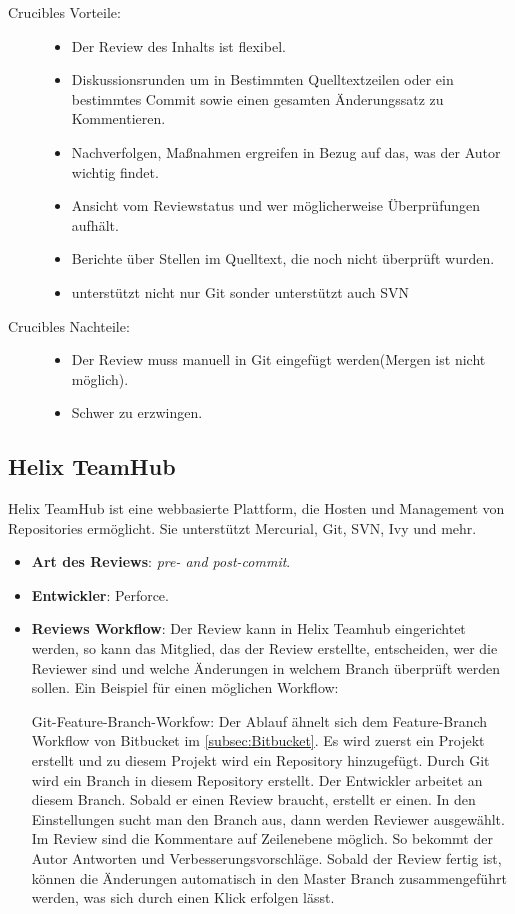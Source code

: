 \begin{description}
	\item [Crucibles Vorteile:] \hfill
	\begin{itemize}
		\item Der Review des Inhalts ist flexibel.
		\item Diskussionsrunden um in Bestimmten Quelltextzeilen oder ein bestimmtes Commit sowie einen gesamten Änderungssatz zu Kommentieren.
		\item Nachverfolgen, Maßnahmen ergreifen in Bezug auf das, was der Autor wichtig findet.
		\item Ansicht vom Reviewstatus und wer möglicherweise Überprüfungen aufhält.
		\item Berichte über Stellen im Quelltext, die noch nicht überprüft wurden.
		\item unterstützt nicht nur Git sonder unterstützt auch \ac{SVN}
	\end{itemize}
	
	\item [Crucibles Nachteile:] \hfill
	\begin{itemize}
		\item Der Review muss manuell in Git eingefügt werden(Mergen ist nicht möglich).
		\item Schwer zu erzwingen.
	\end{itemize}
\end{description}

\subsection{Helix TeamHub}
\label{subsec:HelixTeamHub}

Helix TeamHub ist eine webbasierte Plattform, die Hosten und Management von Repositories ermöglicht. Sie unterstützt Mercurial, Git, \ac{SVN}, Ivy und mehr.

\begin{itemize}
	\item \textbf{Art des Reviews}: \textit{pre- and post-commit}.
	\item \textbf{Entwickler}: Perforce. 
	\item \textbf{Reviews Workflow}: Der Review kann in Helix Teamhub eingerichtet werden, so kann das Mitglied, das der Review erstellte, entscheiden, wer die Reviewer
		 sind und welche Änderungen in welchem Branch überprüft werden sollen.
		 Ein Beispiel für einen möglichen Workflow:
		 
		  Git-Feature-Branch-Workfow: Der Ablauf ähnelt sich dem Feature-Branch Workflow von Bitbucket im \cref{subsec:Bitbucket}.
		  Es wird zuerst ein Projekt erstellt und zu diesem Projekt wird ein Repository hinzugefügt. Durch Git wird ein Branch in diesem Repository
		  erstellt. Der Entwickler arbeitet an diesem Branch. Sobald er einen Review braucht, erstellt er einen. In den Einstellungen sucht man den Branch aus, dann werden Reviewer
		  ausgewählt. Im Review sind die Kommentare auf Zeilenebene möglich. So bekommt der Autor Antworten und Verbesserungsvorschläge. Sobald der Review fertig ist,
		  können die Änderungen automatisch in den Master Branch zusammengeführt werden, was sich durch einen Klick erfolgen lässt. 
\end{itemize}

